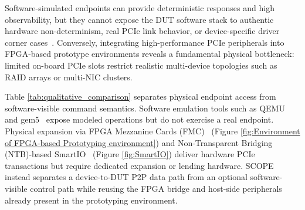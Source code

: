 \documentclass[10pt,conference,letterpaper]{IEEEtran}
\begin{document}
Software-simulated endpoints can provide deterministic responses and high observability, but they cannot expose the DUT software stack to authentic hardware non-determinism, real PCIe link behavior, or device-specific driver corner cases~\cite{karandikar2018firesim}. Conversely, integrating high-performance PCIe peripherals into FPGA-based prototype environments reveals a fundamental physical bottleneck: limited on-board PCIe slots restrict realistic multi-device topologies such as RAID arrays or multi-NIC clusters.
\begin{table}[t]
\centering
\caption{Design-Space Positioning of Peripheral Integration Schemes}
\label{tab:qualitative_comparison}
\renewcommand{\arraystretch}{1.35}
\end{table}

Table \ref{tab:qualitative_comparison} separates physical endpoint access from software-visible command semantics. Software emulation tools such as QEMU~\cite{bellard2005qemu} and gem5~\cite{lowe2020gem5} expose modeled operations but do not exercise a real endpoint. Physical expansion via FPGA Mezzanine Cards (FMC)~\cite{seelam2009design} (Figure \ref{fig:Environment of FPGA-based Prototyping environment}) and Non-Transparent Bridging (NTB)-based SmartIO~\cite{markussen2021smartio} (Figure \ref{fig:SmartIO}) deliver hardware PCIe transactions but require dedicated expansion or lending hardware. SCOPE instead separates a device-to-DUT P2P data path from an optional software-visible control path while reusing the FPGA bridge and host-side peripherals already present in the prototyping environment.
\end{document}
